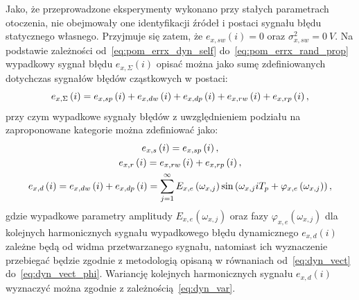 Jako, że przeprowadzone eksperymenty wykonano przy stałych parametrach otoczenia, nie obejmowały one identyfikacji źródeł i postaci sygnału błędu statycznego własnego. Przyjmuje się zatem, że $e_{x,sw}(i) = 0$ oraz $\sigma_{x,sw}^{2} = \qty{0}{V}$. Na podstawie zależności od~\eqref{eq:pom_errx_dyn_self} do~\eqref{eq:pom_errx_rand_prop} wypadkowy sygnał błędu $e_{x,\Sigma}(i)$ opisać można jako sumę zdefiniowanych dotychczas sygnałów błędów cząstkowych w postaci:
\begin{equation}
e_{x,\Sigma} \left(i\right) = e_{x,sp} \left(i\right) + e_{x,dw} \left(i\right) + e_{x,dp} \left(i\right) + e_{x,rw} \left(i\right) + e_{x,rp} \left(i\right) \label{eq:pom_errx_sum},
\end{equation}
przy czym wypadkowe sygnały błędów z uwzględnieniem podziału na zaproponowane kategorie można zdefiniować jako:
\begin{gather}
e_{x,s} \left(i\right) = e_{x,sp} \left(i\right) \label{eq:pom_errx_stat}, \\
e_{x,r} \left(i\right) = e_{x,rw} \left(i\right) + e_{x,rp} \left(i\right) \label{eq:pom_errx_rand}, \\
e_{x,d} \left(i\right) = e_{x,dw} \left(i\right) + e_{x,dp} \left(i\right) = \sum _{j=1} ^{\infty} E_{x,e} \left(\omega_{x,j}\right) \sin \left(\omega_{x,j} iT_{p} + \varphi_{x,e} \left(\omega_{x,j}\right)\right) \label{eq:pom_errx_dyn},
\end{gather}
gdzie wypadkowe parametry amplitudy $E_{x,e}(\omega_{x,j})$ oraz fazy $\varphi_{x,e}(\omega_{x,j})$ dla kolejnych harmonicznych sygnału wypadkowego błędu dynamicznego $e_{x,d}(i)$ zależne będą od widma przetwarzanego sygnału, natomiast ich wyznaczenie przebiegać będzie zgodnie z metodologią opisaną w równaniach od~\eqref{eq:dyn_vect} do~\eqref{eq:dyn_vect_phi}. Wariancję kolejnych harmonicznych sygnału $e_{x,d}(i)$ wyznaczyć można zgodnie z zależnością~\eqref{eq:dyn_var}.

